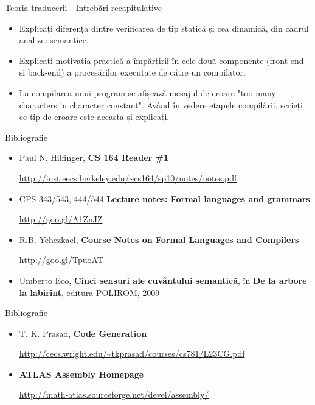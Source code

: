 \documentclass[pdf]{beamer}
\begin{document}
\begin{frame}{Teoria traducerii - Intrebări recapitulative}
\begin{itemize}
\item
Explicați diferența dintre verificarea de tip statică și cea dinamică, din cadrul analizei semantice.
\newline

\item
Explicați motivația practică a împărțirii în cele două componente (front-end și back-end) a procesărilor executate de către un compilator.
\newline

\item
La compilarea unui program se afișează mesajul de eroare "too many characters in character constant". Având în vedere etapele compilării, scrieți ce tip de eroare este aceasta și explicați.

\end{itemize}
\end{frame}



\begin{frame}{Bibliografie}
\begin{itemize}
\item
Paul N. Hilfinger, \textbf{CS 164 Reader \#1}

\url{http://inst.eecs.berkeley.edu/~cs164/sp10/notes/notes.pdf}
\newline

\item
CPS 343/543, 444/544 \textbf{Lecture notes: Formal languages and grammars}

\url{http://goo.gl/A1ZnJZ}
\newline

\item
R.B. Yehezkael, \textbf{Course Notes on Formal Languages and Compilers} 

\url{http://goo.gl/TpuoAT}
\newline

\item
Umberto Eco, \textbf{Cinci sensuri ale cuvântului semantică}, în \textbf{De la arbore la labirint}, editura POLIROM, 2009
\end{itemize}
\end{frame}



\begin{frame}{Bibliografie}
\begin{itemize}
\item
T. K. Prasad, \textbf{Code Generation}

\url{http://cecs.wright.edu/~tkprasad/courses/cs781/L23CG.pdf}

\item
\textbf{ATLAS Assembly Homepage}

\url{http://math-atlas.sourceforge.net/devel/assembly/}

\end{itemize}
\end{frame}
\end{document}
